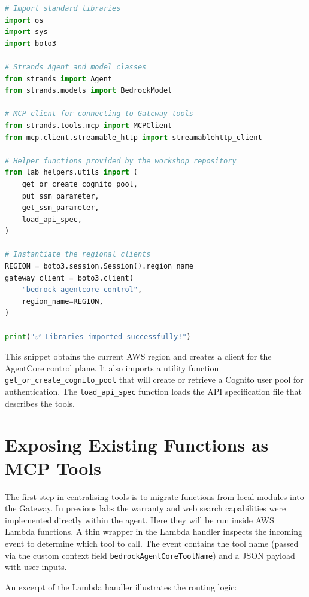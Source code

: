 \begin{lstlisting}[language=Python]
# Import standard libraries
import os
import sys
import boto3

# Strands Agent and model classes
from strands import Agent
from strands.models import BedrockModel

# MCP client for connecting to Gateway tools
from strands.tools.mcp import MCPClient
from mcp.client.streamable_http import streamablehttp_client

# Helper functions provided by the workshop repository
from lab_helpers.utils import (
    get_or_create_cognito_pool,
    put_ssm_parameter,
    get_ssm_parameter,
    load_api_spec,
)

# Instantiate the regional clients
REGION = boto3.session.Session().region_name
gateway_client = boto3.client(
    "bedrock-agentcore-control",
    region_name=REGION,
)

print("✅ Libraries imported successfully!")

\end{lstlisting}

This snippet obtains the current AWS region and creates a client for the
AgentCore control plane.  It also imports a utility function
\texttt{get\_or\_create\_cognito\_pool} that will create or retrieve a
Cognito user pool for authentication.  The \texttt{load\_api\_spec}
function loads the API specification file that describes the tools.

\section{Exposing Existing Functions as MCP Tools}

The first step in centralising tools is to migrate functions from local
modules into the Gateway.  In previous labs the warranty and web search
capabilities were implemented directly within the agent.  Here they will be
run inside AWS Lambda functions.  A thin wrapper in the Lambda handler
inspects the incoming event to determine which tool to call.  The event
contains the tool name (passed via the custom context field
\texttt{bedrockAgentCoreToolName}) and a JSON payload with user inputs.

An excerpt of the Lambda handler illustrates the routing logic:


